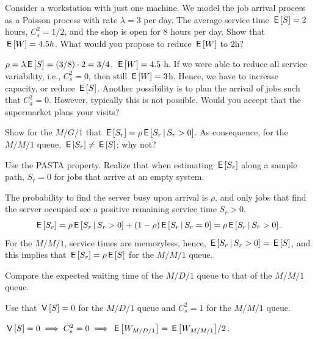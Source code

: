 \documentclass[queueing-book.tex]{subfiles}
\begin{document}
\begin{exercise}\label{ex:l-241}
 Consider a workstation with just one machine.
 We model the job arrival process as a Poisson process with rate $\lambda=3$ per day.
 The average service time $\,\mathsf{E}\left[S\right] = 2$ hours, $C^2_s = 1/2$, and the shop is open for 8 hours per day.
Show that  $\,\mathsf{E}\left[W\right] = 4.5h$. What would you propose to reduce $\,\mathsf{E}\left[W\right]$ to 2h?
\begin{solution}
$\rho = \lambda \,\mathsf{E}\left[S\right] = (3/8)\cdot 2 = 3/4$, $\,\mathsf{E}\left[W\right] = 4.5$ h.
If we were able to reduce all service variability, i.e., $C_s^2=0$, then still $\,\mathsf{E}\left[W\right] = 3$h.
Hence, we have to increase capacity, or reduce $\,\mathsf{E}\left[S\right]$.
Another possibility is to plan the arrival of jobs such that $C_a^2=0$.
However, typically this is not possible.
Would you accept that the supermarket plans your visits?
\end{solution}
\end{exercise}





\begin{exercise}\label{ex:5}
Show for the $M/G/1$ that $\,\mathsf{E}\left[S_r\right] = \rho \,\mathsf{E}\left[S_r\,\middle|\, S_r>0\right]$.  As consequence, for the $M/M/1$ queue, $\,\mathsf{E}\left[S_{r}\right] \neq \,\mathsf{E}\left[S\right]$; why not?
\begin{hint}
Use the PASTA property. Realize that when estimating $\,\mathsf{E}\left[S_r\right]$ along a sample path, $S_r=0$ for jobs that arrive at an empty system.
\end{hint}
\begin{solution}
 The probability to find the server busy upon arrival is $\rho$, and only jobs that find the server occupied see a positive remaining service time $S_r>0$.
\begin{equation*}
\,\mathsf{E}\left[S_r\right] = \rho \,\mathsf{E}\left[S_r\,\middle|\, S_r >0\right] + (1-\rho) \,\mathsf{E}\left[S_r\,\middle|\, S_r = 0\right] = \rho \,\mathsf{E}\left[S_r\,\middle|\, S_r>0\right].
\end{equation*}
For the $M/M/1$, service times are memoryless, hence, $\,\mathsf{E}\left[S_r \,\middle|\, S_r>0\right] = \,\mathsf{E}\left[S\right]$, and this implies that $\,\mathsf{E}\left[S_r\right] = \rho \,\mathsf{E}\left[S\right]$ for the $M/M/1$ queue.
\end{solution}
\end{exercise}



\begin{exercise}
Compare  the expected waiting time of the $M/D/1$ queue to that of the $M/M/1$ queue. %
\begin{hint}
Use that $\,\mathsf{V}\left[S\right]=0$ for the $M/D/1$ queue and $C_{s}^{2} = 1$ for the $M/M/1$ queue.
\end{hint}
\begin{solution}
$\,\mathsf{V}\left[S\right] = 0 \implies C_s^2 = 0 \implies \,\mathsf{E}\left[W_{M/D/1}\right] = {\,\mathsf{E}\left[W_{M/M/1}\right]}/2$.
\end{solution}
\end{exercise}
\end{document}
